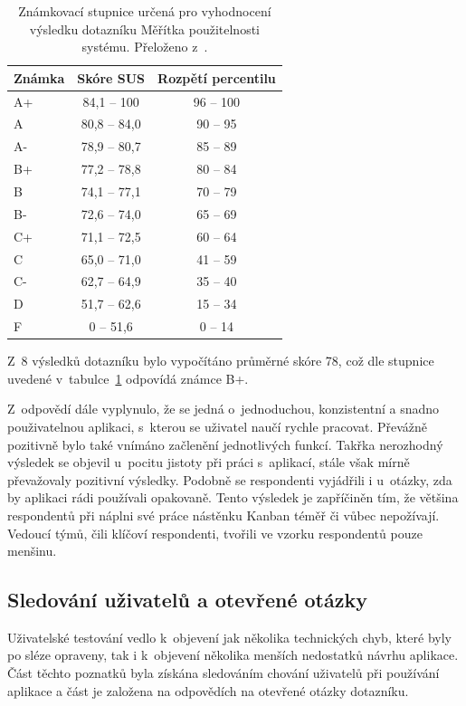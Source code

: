 \begin{table}[H]
\centering
\label{tab:sus}
\caption{Známkovací stupnice určená pro vyhodnocení výsledku dotazníku Měřítka použitelnosti systému. Přeloženo z~\cite{bib:sus-statistics}.}
\begin{tabular}{|l|c|c|}
\hline
Známka & Skóre SUS  & Rozpětí percentilu  \\
\hline
A+    & 84,1 – 100  & 96 – 100          \\
A~    & 80,8 – 84,0 & 90 – 95           \\
A-    & 78,9 – 80,7 & 85 – 89           \\
B+    & 77,2 – 78,8 & 80 – 84           \\
B     & 74,1 – 77,1 & 70 – 79           \\
B-    & 72,6 – 74,0 & 65 – 69           \\
C+    & 71,1 – 72,5 & 60 – 64           \\
C     & 65,0 – 71,0 & 41 – 59           \\
C-    & 62,7 – 64,9 & 35 – 40           \\
D     & 51,7 – 62,6 & 15 – 34           \\
F     &    0 – 51,6 &  0 – 14           \\
\hline
\end{tabular}
\end{table}

Z~8 výsledků dotazníku bylo vypočítáno průměrné skóre 78, což dle stupnice uvedené v~tabulce~\ref{tab:sus} odpovídá známce B+.

Z~odpovědí dále vyplynulo, že se jedná o~jednoduchou, konzistentní a snadno použivatelnou aplikaci, s~kterou se uživatel naučí rychle pracovat. Převážně pozitivně bylo také vnímáno začlenění jednotlivých funkcí. Takřka nerozhodný výsledek se objevil u~pocitu jistoty při práci s~aplikací, stále však mírně převažovaly pozitivní výsledky. Podobně se respondenti vyjádřili i u~otázky, zda by aplikaci rádi používali opakovaně. Tento výsledek je zapříčiněn tím, že většina respondentů při náplni své práce nástěnku Kanban téměř či vůbec nepožívají. Vedoucí týmů, čili klíčoví respondenti, tvořili ve vzorku respondentů pouze menšinu.


\subsection{Sledování uživatelů a otevřené otázky}
Uživatelské testování vedlo k~objevení jak několika technických chyb, které byly po sléze opraveny, tak i k~objevení několika menších nedostatků návrhu aplikace. Část těchto poznatků byla získána sledováním chování uživatelů při používání aplikace a část je založena na odpovědích na otevřené otázky dotazníku. 

